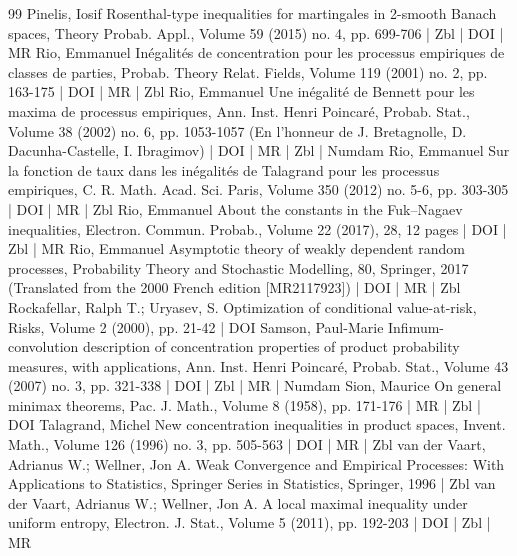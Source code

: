 \begin{thebibliography}{99}
Pinelis, Iosif Rosenthal-type inequalities for martingales in 2-smooth Banach spaces, Theory Probab. Appl., Volume 59 (2015) no. 4, pp. 699-706 | Zbl | DOI | MR
Rio, Emmanuel Inégalités de concentration pour les processus empiriques de classes de parties, Probab. Theory Relat. Fields, Volume 119 (2001) no. 2, pp. 163-175 | DOI | MR | Zbl
Rio, Emmanuel Une inégalité de Bennett pour les maxima de processus empiriques, Ann. Inst. Henri Poincaré, Probab. Stat., Volume 38 (2002) no. 6, pp. 1053-1057 (En l’honneur de J. Bretagnolle, D. Dacunha-Castelle, I. Ibragimov) | DOI | MR | Zbl | Numdam
Rio, Emmanuel Sur la fonction de taux dans les inégalités de Talagrand pour les processus empiriques, C. R. Math. Acad. Sci. Paris, Volume 350 (2012) no. 5-6, pp. 303-305 | DOI | MR | Zbl
Rio, Emmanuel About the constants in the Fuk–Nagaev inequalities, Electron. Commun. Probab., Volume 22 (2017), 28, 12 pages | DOI | Zbl | MR
Rio, Emmanuel Asymptotic theory of weakly dependent random processes, Probability Theory and Stochastic Modelling, 80, Springer, 2017 (Translated from the 2000 French edition [MR2117923]) | DOI | MR | Zbl
Rockafellar, Ralph T.; Uryasev, S. Optimization of conditional value-at-risk, Risks, Volume 2 (2000), pp. 21-42 | DOI
Samson, Paul-Marie Infimum-convolution description of concentration properties of product probability measures, with applications, Ann. Inst. Henri Poincaré, Probab. Stat., Volume 43 (2007) no. 3, pp. 321-338 | DOI | Zbl | MR | Numdam
Sion, Maurice On general minimax theorems, Pac. J. Math., Volume 8 (1958), pp. 171-176 | MR | Zbl | DOI
Talagrand, Michel New concentration inequalities in product spaces, Invent. Math., Volume 126 (1996) no. 3, pp. 505-563 | DOI | MR | Zbl
van der Vaart, Adrianus W.; Wellner, Jon A. Weak Convergence and Empirical Processes: With Applications to Statistics, Springer Series in Statistics, Springer, 1996 | Zbl
van der Vaart, Adrianus W.; Wellner, Jon A. A local maximal inequality under uniform entropy, Electron. J. Stat., Volume 5 (2011), pp. 192-203 | DOI | Zbl | MR
\end{thebibliography}
